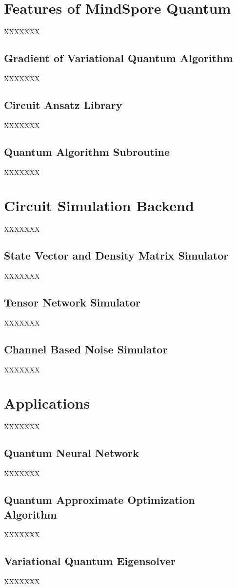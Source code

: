 \documentclass[pra,twocolumn,superscriptaddress,floatfix,nofootinbib,amsmath,amssymb]{revtex4-1}
\begin{document}
\section{Features of MindSpore Quantum}
XXXXXXX
\subsection{Gradient of Variational Quantum Algorithm}
XXXXXXX
\subsection{Circuit Ansatz Library}
XXXXXXX
\subsection{Quantum Algorithm Subroutine}
XXXXXXX


\section{Circuit Simulation Backend}
XXXXXXX
\subsection{State Vector and Density Matrix Simulator}
XXXXXXX
\subsection{Tensor Network Simulator}
XXXXXXX
\subsection{Channel Based Noise Simulator}
XXXXXXX


\section{Applications}
XXXXXXX
\subsection{Quantum Neural Network}
XXXXXXX
\subsection{Quantum Approximate Optimization Algorithm}
XXXXXXX
\subsection{Variational Quantum Eigensolver}
XXXXXXX
\end{document}
